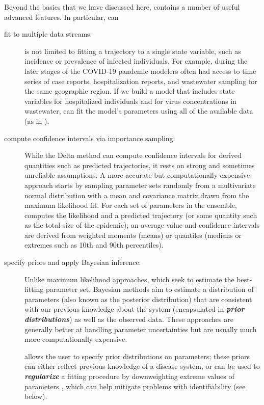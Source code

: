 \documentclass[]{interact}\usepackage[]{graphicx}\usepackage[]{xcolor}
\theoremstyle{plain}%
\theoremstyle{definition}
\theoremstyle{remark}
\newcommand{\term}[1]{{\bfseries\slshape#1}}
\newcommand{\code}[1]{\texttt{\detokenize{#1}}}
\begin{document}
Beyond the basics that we have discussed here, \code{fitode} contains
a number of useful advanced features. In particular,
\code{fitode} can
\begin{description}
\item [fit to multiple data streams:] \code{fitode} is not limited to
  fitting a trajectory to a single state variable, such as incidence
  or prevalence of infected individuals. For example, during the later
  stages of the COVID-19 pandemic modelers often had access to time
  series of case reports, hospitalization reports, and wastewater
  sampling for the same geographic region. If we build a model that
  includes state variables for hospitalized individuals and for virus
  concentrations in wastewater, \code{fitode} can fit the model's
  parameters using all of the available data (as in
  \citet{Nour+2022}).
\item [compute confidence intervals via importance sampling:]
  While the Delta method can compute confidence intervals for derived
  quantities such as predicted trajectories, it rests on strong
  and sometimes unreliable assumptions. A more accurate
  but computationally expensive approach starts by
  sampling parameter sets randomly from a multivariate normal
  distribution with a mean and covariance matrix drawn from
  the maximum likelihood fit. For each set of parameters in
  the ensemble, \code{fitode} computes the likelihood and
  a predicted trajectory (or some quantity such as the total
  size of the epidemic); an average value and confidence intervals
  are derived from weighted moments (means) or quantiles (medians
  or extremes such as 10th and 90th percentiles).
\item [specify priors and apply Bayesian inference:] Unlike maximum
  likelihood approaches, which seek to estimate the best-fitting
  parameter set, Bayesian methods aim to estimate a distribution of
  parameters (also known as the posterior distribution) that are
  consistent with our previous knowledge about the system
  (encapsulated in \term{prior distributions}) as well as the observed
  data.  These approaches are generally better at handling parameter
  uncertainties \citep{elderd2006uncertainty} but are usually much
  more computationally expensive.

  \code{fitode} allows the user to specify prior distributions on
  parameters; these priors can either reflect previous knowledge of a
  disease system, or can be used to \term{regularize} a fitting
  procedure by downweighting extreme values of parameters
  \citep{Lemo2019}, which can help mitigate problems with
  identifiability (see below).


\end{description}
\end{document}
